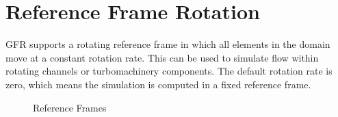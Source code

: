 \section{Reference Frame Rotation}
\label{SEC:Ref_Frame}

GFR supports a rotating reference frame in which all elements in the
domain move at a constant rotation rate.
%
This can be used to simulate flow within rotating channels or
turbomachinery components.
%
The default rotation rate is zero, which means the simulation is
computed in a fixed reference frame.

\begin{figure}[h]
 \begin{center}
  \caption{Reference Frames}
  \label{FIG:RefFrames}
 \end{center}
\end{figure}


